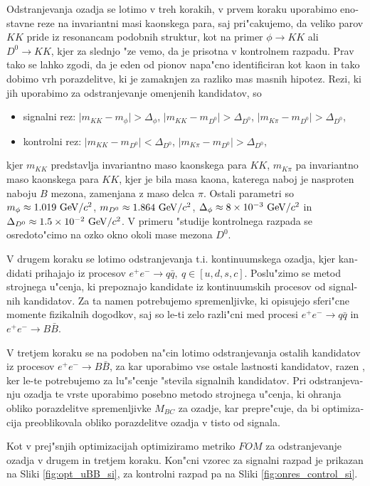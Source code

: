 \begin{otherlanguage}{slovene}
Odstranjevanja ozadja se lotimo v treh korakih, v prvem koraku uporabimo enostavne reze na invariantni masi kaonskega para, saj pri"cakujemo, da veliko parov $KK$ pride iz resonancam podobnih struktur, kot na primer $\phi \to KK$ ali $D^0 \to KK$, kjer za slednjo "ze vemo, da je prisotna v kontrolnem razpadu. Prav tako se lahko zgodi, da je eden od pionov napa"cno identificiran kot kaon in tako dobimo vrh porazdelitve, ki je zamaknjen za razliko mas masnih hipotez. Rezi, ki jih uporabimo za odstranjevanje omenjenih kandidatov, so
\begin{itemize}
\item signalni rez: $\vert m_{KK} - m_{\phi} \vert > \Delta_\phi$, $\vert m_{KK} - m_{D^0} \vert > \Delta_{D^0}$, $\vert m_{K\pi} - m_{D^0} \vert > \Delta_{D^0}$,
\item kontrolni rez: $\vert m_{KK} - m_{D^0} \vert < \Delta_{D^0}$, $\vert m_{K\pi} - m_{D^0} \vert > \Delta_{D^0}$,
\end{itemize}
kjer $m_{KK}$ predstavlja invariantno maso kaonskega para $KK$, $m_{K\pi}$ pa invariantno maso kaonskega para $KK$, kjer je bila masa kaona, katerega naboj je nasproten naboju $B$ mezona, zamenjana z maso delca $\pi$. Ostali parametri so $m_\phi \approx 1.019\mathrm{~GeV}/c^2$, $m_{D^0} \approx 1.864\mathrm{~GeV}/c^2$, $\Delta_\phi \approx 8\times 10^{-3}\mathrm{~GeV}/c^2$ in $\Delta_{D^0} \approx 1.5\times 10^{-2}\mathrm{~GeV}/c^2$. V primeru "studije kontrolnega razpada se osredoto"cimo na ozko okno okoli mase mezona $D^0$. 

V drugem koraku se lotimo odstranjevanja t.i. kontinuumskega ozadja, kjer kandidati prihajajo iz procesov $e^+e^- \to q \bar q,~q\in[u, d, s, c]$. Poslu"zimo se metod strojnega u"cenja, ki prepoznajo kandidate iz kontinuumskih procesov od signalnih kandidatov. Za ta namen potrebujemo spremenljivke, ki opisujejo sferi"cne momente fizikalnih dogodkov, saj so le-ti zelo razli"cni med procesi $e^+e^- \to q \bar q$ in $e^+e^- \to B \bar B$.

V tretjem koraku se na podoben na"cin lotimo odstranjevanja ostalih kandidatov iz procesov $e^+e^- \to B \bar B$, za kar uporabimo vse ostale lastnosti kandidatov, razen \varss, ker le-te potrebujemo za lu"s"cenje "stevila signalnih kandidatov. Pri odstranjevanju ozadja te vrste uporabimo posebno metodo strojnega u"cenja, ki ohranja obliko porazdelitve spremenljivke $M_{BC}$ za ozadje, kar prepre"cuje, da bi optimizacija preoblikovala obliko porazdelitve ozadja v tisto od signala.

Kot v prej"snjih optimizacijah optimiziramo metriko $FOM$ za odstranjevanje ozadja v drugem in tretjem koraku. Kon"cni vzorec za signalni razpad je prikazan na Sliki \ref{fig:opt_uBB_si}, za kontrolni razpad pa na Sliki \ref{fig:onres_control_si}.


\end{otherlanguage}
